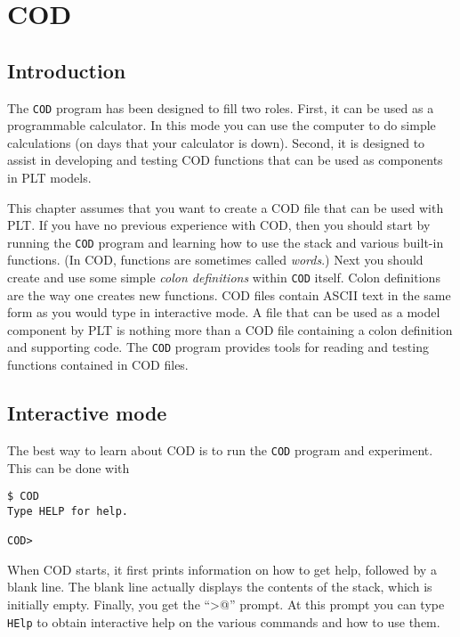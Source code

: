 \chapter{COD}

\section{Introduction}
The {\tt COD} program has been designed to fill two roles.
First, it can be used as a programmable calculator.
In this mode you can use the computer to do simple calculations
(on days that your calculator is down).
Second, it is designed to assist in developing and testing COD functions
that can be used as components in PLT models.

This chapter assumes that you want to create a COD file
that can be used with PLT.
If you have no previous experience with COD,
then you should start by running the {\tt COD} program
and learning how to use the stack and various built-in functions.
(In COD, functions are sometimes called {\em words}.)
Next you should create and use some simple {\em colon definitions}
within {\tt COD} itself.
Colon definitions are the way one creates new functions.
COD files contain ASCII text in the same form
as you would type in interactive mode.
A file that can be used as a model component by PLT
is nothing more than a COD file
containing a colon definition and supporting code.
The {\tt COD} program provides tools
for reading and testing functions contained in COD files.

\section{Interactive mode}
The best way to learn about COD
is to run the {\tt COD} program and experiment.
This can be done with
\begin{verbatim}
$ COD
Type HELP for help.

COD>
\end{verbatim}
When COD starts, it first prints information on how to get help,
followed by a blank line.
The blank line actually displays the contents of the stack,
which is initially empty.
Finally, you get the ``\verb@COD>@'' prompt.
At this prompt you can type {\tt HElp}
to obtain interactive help on the various commands and how to use them.

